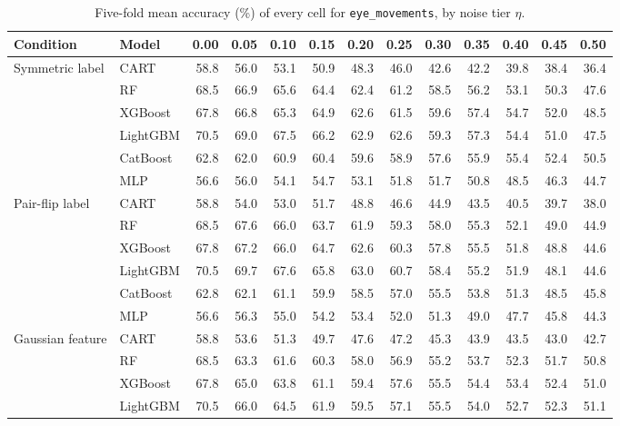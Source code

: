 \begin{table}[p]
\centering
\tiny
\setlength{\tabcolsep}{2.6pt}
\caption{Five-fold mean accuracy (\%) of every cell for \texttt{eye\_movements}, by noise tier $\eta$.}
\label{tab:grid_eye_movements}
\begin{tabular}{@{}llrrrrrrrrrrr@{}}
\toprule
Condition & Model & 0.00 & 0.05 & 0.10 & 0.15 & 0.20 & 0.25 & 0.30 & 0.35 & 0.40 & 0.45 & 0.50 \\
\midrule
Symmetric label & CART & 58.8 & 56.0 & 53.1 & 50.9 & 48.3 & 46.0 & 42.6 & 42.2 & 39.8 & 38.4 & 36.4 \\
 & RF & 68.5 & 66.9 & 65.6 & 64.4 & 62.4 & 61.2 & 58.5 & 56.2 & 53.1 & 50.3 & 47.6 \\
 & XGBoost & 67.8 & 66.8 & 65.3 & 64.9 & 62.6 & 61.5 & 59.6 & 57.4 & 54.7 & 52.0 & 48.5 \\
 & LightGBM & 70.5 & 69.0 & 67.5 & 66.2 & 62.9 & 62.6 & 59.3 & 57.3 & 54.4 & 51.0 & 47.5 \\
 & CatBoost & 62.8 & 62.0 & 60.9 & 60.4 & 59.6 & 58.9 & 57.6 & 55.9 & 55.4 & 52.4 & 50.5 \\
 & MLP & 56.6 & 56.0 & 54.1 & 54.7 & 53.1 & 51.8 & 51.7 & 50.8 & 48.5 & 46.3 & 44.7 \\
\midrule
Pair-flip label & CART & 58.8 & 54.0 & 53.0 & 51.7 & 48.8 & 46.6 & 44.9 & 43.5 & 40.5 & 39.7 & 38.0 \\
 & RF & 68.5 & 67.6 & 66.0 & 63.7 & 61.9 & 59.3 & 58.0 & 55.3 & 52.1 & 49.0 & 44.9 \\
 & XGBoost & 67.8 & 67.2 & 66.0 & 64.7 & 62.6 & 60.3 & 57.8 & 55.5 & 51.8 & 48.8 & 44.6 \\
 & LightGBM & 70.5 & 69.7 & 67.6 & 65.8 & 63.0 & 60.7 & 58.4 & 55.2 & 51.9 & 48.1 & 44.6 \\
 & CatBoost & 62.8 & 62.1 & 61.1 & 59.9 & 58.5 & 57.0 & 55.5 & 53.8 & 51.3 & 48.5 & 45.8 \\
 & MLP & 56.6 & 56.3 & 55.0 & 54.2 & 53.4 & 52.0 & 51.3 & 49.0 & 47.7 & 45.8 & 44.3 \\
\midrule
Gaussian feature & CART & 58.8 & 53.6 & 51.3 & 49.7 & 47.6 & 47.2 & 45.3 & 43.9 & 43.5 & 43.0 & 42.7 \\
 & RF & 68.5 & 63.3 & 61.6 & 60.3 & 58.0 & 56.9 & 55.2 & 53.7 & 52.3 & 51.7 & 50.8 \\
 & XGBoost & 67.8 & 65.0 & 63.8 & 61.1 & 59.4 & 57.6 & 55.5 & 54.4 & 53.4 & 52.4 & 51.0 \\
 & LightGBM & 70.5 & 66.0 & 64.5 & 61.9 & 59.5 & 57.1 & 55.5 & 54.0 & 52.7 & 52.3 & 51.1 \\

\end{tabular}
\end{table}
